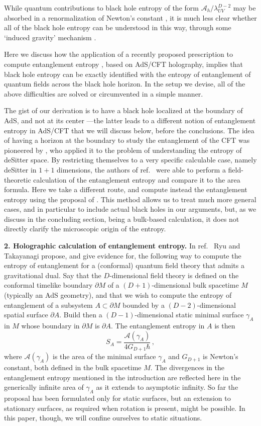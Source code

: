 \documentclass[12pt]{article}
\newcommand{\beq}{\begin{equation}}
\newcommand{\eeq}{\end{equation}}
\begin{document}
While quantum contributions to black hole entropy of the form
$\mathcal{A}_h/\lambda_{UV}^{D-2}$ may be absorbed in a renormalization
of Newton's constant \cite{sussug}, it is much less clear whether all of
the black hole entropy can be understood in this way, through some
`induced gravity' mechanism \cite{jac,ff}.

Here we discuss how the application of a recently proposed prescription to
compute entanglement entropy \cite{ryta}, based on
AdS/CFT holography, implies that black hole entropy can be exactly
identified with the entropy of entanglement of quantum fields across the
black hole horizon. In the setup we devise, all of the above
difficulties are solved or circumvented in a simple manner.

The gist of our derivation is to have a black hole localized at the
boundary of AdS, and not at its center ---the latter leads to a
different notion of entanglement entropy in AdS/CFT \cite{malda,brus}
that we will discuss below, before the conclusions. The idea of having a
horizon at the boundary to study the entanglement of the CFT was
pioneered by \cite{hms}, who applied it to the problem of understanding
the entropy of deSitter space. By restricting themselves to a very
specific calculable case, namely deSitter in $1+1$ dimensions, the
authors of ref.~\cite{hms} were able to perform a field-theoretic
calculation of the entanglement entropy and compare it to the area
formula. Here we take a different route, and compute instead the
entanglement entropy using the proposal of \cite{ryta}. This method
allows us to treat much more general cases, and in particular to include
actual black holes in our arguments, but, as we discuss in the
concluding section, being a bulk-based calculation, it does not directly
clarify the microscopic origin of the entropy.


\bigskip

\noindent\textbf{2. Holographic calculation of entanglement entropy.} In
ref.~\cite{ryta} Ryu and Takayanagi propose, and give evidence for, the
following way to compute the entropy of entanglement for a (conformal)
quantum field theory that admits a gravitational dual. Say that the
$D$-dimensional field theory is defined on the conformal timelike
boundary $\partial M$ of a $(D+1)$-dimensional bulk spacetime $M$
(typically an AdS geometry), and that we wish to compute the entropy of
entanglement of a subsystem $A\subset \partial M$ bounded by a
$(D-2)$-dimensional spatial surface $\partial A$. Build then a
$(D-1)$-dimensional static minimal surface $\gamma_A$ in $M$ whose
boundary in $\partial M$ is $\partial A$. The entanglement entropy in
$A$ is then 
\beq
\label{holoent} S_A=\frac{\mathcal{A}(\gamma_A)}{4
G_{D+1} \hbar}\,, 
\eeq 
where $\mathcal{A}(\gamma_A)$ is the area of the
minimal surface $\gamma_A$ and $G_{D+1}$ is Newton's constant, both
defined in the bulk spacetime $M$. The divergences in the entanglement
entropy mentioned in the introduction are reflected here in the
generically infinite area of $\gamma_A$ as it extends to asymptotic
infinity. So far the proposal has been formulated only for static
surfaces, but an extension to stationary surfaces, as required when
rotation is present, might be possible. In this paper, though, we will
confine ourselves to static situations.
\end{document}
